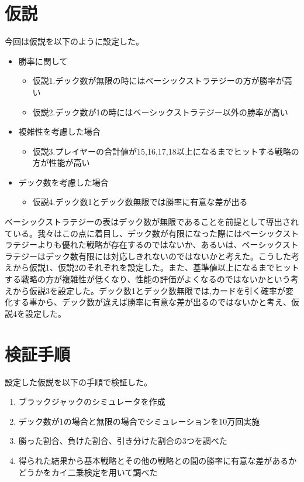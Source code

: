 
\section{仮説}
今回は仮説を以下のように設定した。
\begin{itemize}
\item 勝率に関して
    \begin{itemize}
        \item 仮説1.デック数が無限の時にはベーシックストラテジーの方が勝率が高い
        \item 仮説2.デック数が1の時にはベーシックストラテジー以外の勝率が高い
    \end{itemize}
\item 複雑性を考慮した場合
    \begin{itemize}
        \item 仮説3.プレイヤーの合計値が15,16,17,18以上になるまでヒットする戦略の方が性能が高い
    \end{itemize}
\item デック数を考慮した場合
    \begin{itemize}
        \item 仮説4.デック数1とデック数無限では勝率に有意な差が出る
    \end{itemize}
\end{itemize}
ベーシックストラテジーの表はデック数が無限であることを前提として導出されている。我々はこの点に着目し、デック数が有限になった際にはベーシックストラテジーよりも優れた戦略が存在するのではないか、あるいは、ベーシックストラテジーはデック数有限には対応しきれないのではないかと考えた。こうした考えから仮説1、仮説2のそれぞれを設定した。また、基準値以上になるまでヒットする戦略の方が複雑性が低くなり、性能の評価がよくなるのではないかという考えから仮説3を設定した。デック数1とデック数無限では,カードを引く確率が変化する事から、デック数が違えば勝率に有意な差が出るのではないかと考え、仮説4を設定した。

\section{検証手順}
設定した仮説を以下の手順で検証した。
\begin{enumerate}
\item ブラックジャックのシミュレータを作成
\item デック数が1の場合と無限の場合でシミュレーションを10万回実施
\item 勝った割合、負けた割合、引き分けた割合の3つを調べた
\item 得られた結果から基本戦略とその他の戦略との間の勝率に有意な差があるかどうかをカイ二乗検定を用いて調べた
\end{enumerate}

